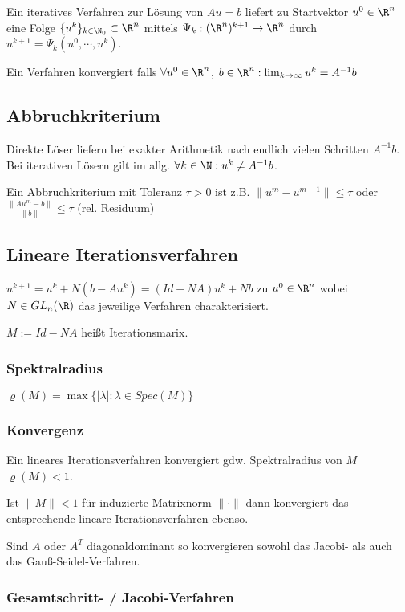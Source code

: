 Ein iteratives Verfahren zur Lösung von $Au=b$ liefert zu Startvektor $u^0 \in \R^n$ eine Folge $\{u^k\}_{k\in \N_0} \subset \R^n$ mittels $\Psi_k : (\R^n)^{k+1} \rightarrow \R^n$ durch $u^{k+1} = \Psi_k(u^0, \cdots, u^k)$.

Ein Verfahren konvergiert falls $\forall u^0 \in \R^n$, $b \in \R^n : \lim_{k\to \infty} u^k = A^{-1}b$

\subsection*{Abbruchkriterium}

Direkte Löser liefern bei exakter Arithmetik nach endlich vielen Schritten $A^{-1}b$. Bei iterativen Lösern gilt im allg. $\forall k \in \N : u^k \neq A^{-1}b$.

Ein Abbruchkriterium mit Toleranz $\tau > 0$ ist z.B. $\|u^m-u^{m-1}\| \leq \tau$ oder $\frac{\|Au^m-b\|}{\|b\|} \leq \tau$ (rel. Residuum)

\subsection*{Lineare Iterationsverfahren}

$u^{k+1} = u^k + N(b-Au^k) = (Id - NA)u^k + Nb$ zu $u^0 \in \R^n$ wobei $N \in GL_n(\R)$ das jeweilige Verfahren charakterisiert.

$M := Id - NA$ heißt Iterationsmarix.

\subsubsection*{Spektralradius}

$\varrho(M) = \max\{|\lambda| : \lambda \in Spec(M)\}$

\subsubsection*{Konvergenz}

Ein lineares Iterationsverfahren konvergiert gdw. Spektralradius von $M$ $\varrho(M) < 1$.

Ist $\|M\| < 1$ für induzierte Matrixnorm $\|\cdot\|$ dann konvergiert das entsprechende lineare Iterationsverfahren ebenso.

Sind $A$ oder $A^T$ diagonaldominant so konvergieren sowohl das Jacobi- als auch das Gauß-Seidel-Verfahren.

\subsubsection*{Gesamtschritt- / Jacobi-Verfahren}

